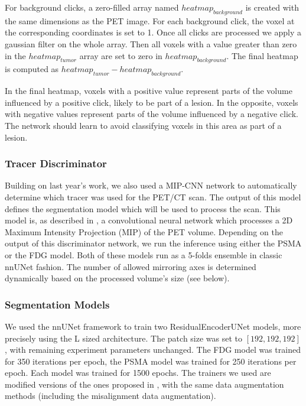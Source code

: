 \documentclass[runningheads]{llncs}
\begin{document}
For background clicks, a zero-filled array named $heatmap_{background}$ is created with the same dimensions as the PET image.
For each background click, the voxel at the corresponding coordinates is set to 1.
Once all clicks are processed we apply a gaussian filter on the whole array.
Then all voxels with a value greater than zero in the $heatmap_{tumor}$ array are set to zero in $heatmap_{background}$.
The final heatmap is computed as $heatmap_{tumor} - heatmap_{background}$.

In the final heatmap, voxels with a positive value represent parts of the volume influenced by a positive click, likely to be part of a lesion.
In the opposite, voxels with negative values represent parts of the volume influenced by a negative click.
The network should learn to avoid classifying voxels in this area as part of a lesion.

\subsubsection{Tracer Discriminator}

Building on last year's work, we also used a MIP-CNN network to automatically determine which tracer was used for the PET/CT scan.
The output of this model defines the segmentation model which will be used to process the scan.
This model is, as described in \cite{mesbah2024autopetiiitracerfrontierfrontier}, a convolutional neural network which processes a 2D Maximum Intensity Projection (MIP) of the PET volume.
Depending on the output of this discriminator network, we run the inference using either the PSMA or the FDG model.
Both of these models run as a 5-folds ensemble in classic nnUNet fashion. The number of allowed mirroring axes is determined dynamically based on the processed volume’s size (see below).

\subsubsection{Segmentation Models}

We used the nnUNet framework to train two ResidualEncoderUNet models, more precisely using the L sized architecture.
The patch size was set to $[192,192,192]$, with remaining experiment parameters unchanged.
The FDG model was trained for 350 iterations per epoch, the PSMA model was trained for 250 iterations per epoch.
Each model was trained for 1500 epochs. 
The trainers we used are modified versions of the ones proposed in \cite{rokuss2024fdgpsmahitchhikersguide}, with the same data augmentation methods (including the misalignment data augmentation).
\end{document}
